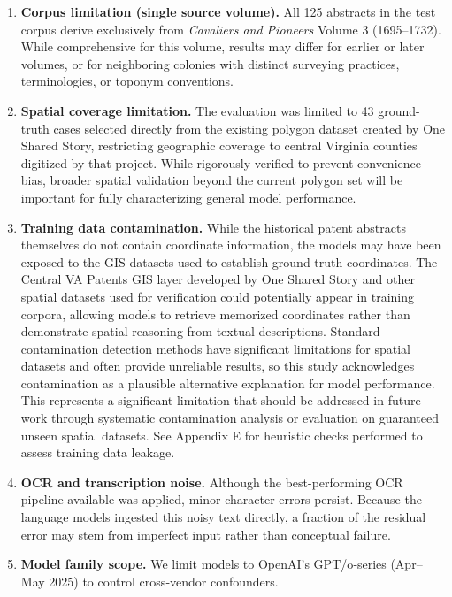 \begin{enumerate}
\def\labelenumi{\arabic{enumi}.}
\item
  \textbf{Corpus limitation (single source volume).} All 125 abstracts
  in the test corpus derive exclusively from \emph{Cavaliers and
  Pioneers} Volume 3 (1695--1732). While comprehensive for this volume,
  results may differ for earlier or later volumes, or for neighboring
  colonies with distinct surveying practices, terminologies, or toponym
  conventions.
\item
  \textbf{Spatial coverage limitation.} The evaluation was limited to 43
  ground-truth cases selected directly from the existing polygon dataset
  created by One Shared Story, restricting geographic coverage to
  central Virginia counties digitized by that project. While rigorously
  verified to prevent convenience bias, broader spatial validation
  beyond the current polygon set will be important for fully
  characterizing general model performance.
\item
  \textbf{Training data contamination.} While the historical patent
  abstracts themselves do not contain coordinate information, the models
  may have been exposed to the GIS datasets used to establish ground
  truth coordinates. The Central VA Patents GIS layer developed by One
  Shared Story \citep{central_va_patents_gis} and other spatial datasets
  used for verification could potentially appear in training corpora,
  allowing models to retrieve memorized coordinates rather than
  demonstrate spatial reasoning from textual descriptions. Standard
  contamination detection methods have significant limitations for
  spatial datasets and often provide unreliable results, so this study
  acknowledges contamination as a plausible alternative explanation for
  model performance. This represents a significant limitation that
  should be addressed in future work through systematic contamination
  analysis or evaluation on guaranteed unseen spatial datasets. See
  Appendix E for heuristic checks performed to assess training data
  leakage.
\item
  \textbf{OCR and transcription noise.} Although the best-performing OCR
  pipeline available was applied, minor character errors persist.
  Because the language models ingested this noisy text directly, a
  fraction of the residual error may stem from imperfect input rather
  than conceptual failure.
\item
  \textbf{Model family scope.} We limit models to OpenAI's GPT/o‑series
  (Apr--May 2025) to control cross‑vendor confounders.

\end{enumerate}
